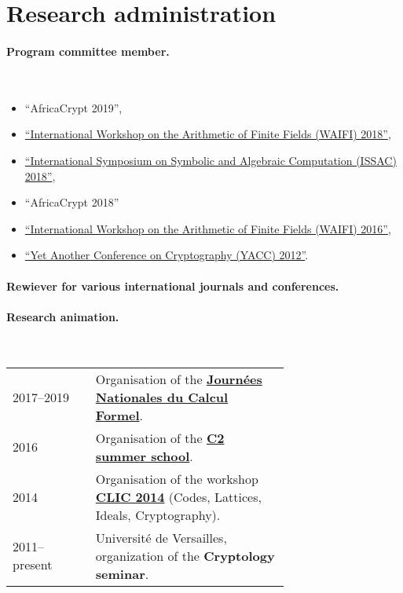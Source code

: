 \documentclass{book}
\begin{document}
\section*{Research administration}

\paragraph{Program committee member.}\

\begin{itemize}
\item
  ``AfricaCrypt 2019'',
\item
  \href{http://waifi.org/}{``International Workshop on the Arithmetic
    of Finite Fields (WAIFI) 2018''},
\item
  \href{http://issac-conference.org/2018/}{``International Symposium
    on Symbolic and Algebraic Computation (ISSAC) 2018''},
\item
  ``AfricaCrypt 2018''
\item
  \href{http://waifi.org/}{``International Workshop on the Arithmetic
    of Finite Fields (WAIFI) 2016''},
\item
  \href{http://yacc.univ-tln.fr/}{``Yet Another Conference on
    Cryptography (YACC) 2012''}.
\end{itemize}

\paragraph{Rewiever for various international journals and conferences.}

\paragraph{Research animation.}\

\begin{tabular}{l p{0.7\linewidth}}
  2017--2019 & Organisation of the
               \href{http://jncf.math.cnrs.fr/}{\textbf{Journées Nationales du Calcul
               Formel}}.\\
  2016 & Organisation of the
         \href{https://ecole-c2-2016.inria.fr/}{\textbf{C2 summer school}}.\\
  2014
             & Organisation of the workshop
               \href{https://idealcodes.github.io/clic-2014}{\textbf{CLIC 2014}} (Codes,
               Lattices, Ideals, Cryptography).\\
  2011--present & Université de
                  Versailles, organization of the
                  \textbf{Cryptology
                  seminar}.
\end{tabular}
\end{document}
